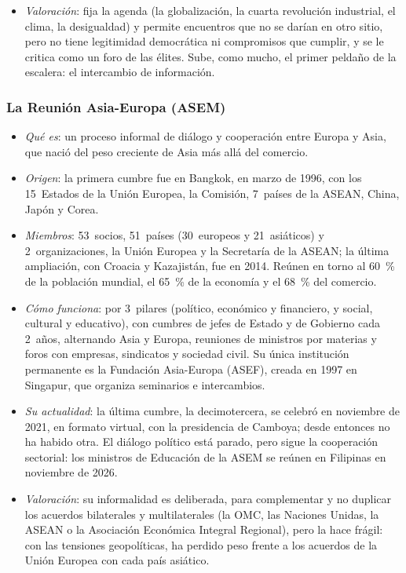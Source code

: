 \documentclass[11pt]{article}
\begin{document}
\begin{itemize}
\begin{itemize}
  \item su Informe de Riesgos Globales de 2026 sitúa la confrontación geoeconómica como el primer riesgo a corto plazo\nocite{WEF2026Riesgos}: es el diagnóstico de un mundo en el que cuesta coordinar.
  \end{itemize}
\item \emph{Valoración}: fija la agenda (la globalización, la cuarta revolución industrial, el clima, la desigualdad) y permite encuentros que no se darían en otro sitio, pero no tiene legitimidad democrática ni compromisos que cumplir, y se le critica como un foro de las élites. Sube, como mucho, el primer peldaño de la escalera: el intercambio de información.
\end{itemize}

\subsubsection{La Reunión Asia-Europa (ASEM)}\label{sec:asem}

\begin{itemize}
\item \emph{Qué es}: un proceso informal de diálogo y cooperación entre Europa y Asia, que nació del peso creciente de Asia más allá del comercio\nocite{ASEM2026Resumen}.
\item \emph{Origen}: la primera cumbre fue en Bangkok, en marzo de 1996, con los 15~Estados de la Unión Europea, la Comisión, 7~países de la ASEAN, China, Japón y Corea.
\item \emph{Miembros}: 53~socios, 51~países (30~europeos y 21~asiáticos) y 2~organizaciones, la Unión Europea y la Secretaría de la ASEAN; la última ampliación, con Croacia y Kazajistán, fue en 2014. Reúnen en torno al 60~\% de la población mundial, el 65~\% de la economía y el 68~\% del comercio\nocite{ASEM2026Resumen}.
\item \emph{Cómo funciona}: por 3~pilares (político, económico y financiero, y social, cultural y educativo), con cumbres de jefes de Estado y de Gobierno cada 2~años, alternando Asia y Europa, reuniones de ministros por materias y foros con empresas, sindicatos y sociedad civil. Su única institución permanente es la Fundación Asia-Europa (ASEF), creada en 1997 en Singapur, que organiza seminarios e intercambios\nocite{ASEF2026}.
\item \emph{Su actualidad}: la última cumbre, la decimotercera, se celebró en noviembre de 2021, en formato virtual, con la presidencia de Camboya\nocite{UE2021ASEM13}; desde entonces no ha habido otra. El diálogo político está parado, pero sigue la cooperación sectorial: los ministros de Educación de la ASEM se reúnen en Filipinas en noviembre de 2026.
\item \emph{Valoración}: su informalidad es deliberada, para complementar y no duplicar los acuerdos bilaterales y multilaterales (la OMC, las Naciones Unidas, la ASEAN o la Asociación Económica Integral Regional), pero la hace frágil: con las tensiones geopolíticas, ha perdido peso frente a los acuerdos de la Unión Europea con cada país asiático.
\end{itemize}
\end{document}

